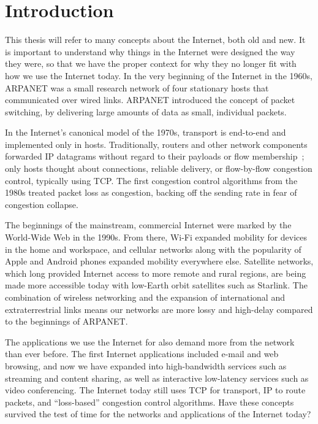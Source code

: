 \chapter{Introduction}
\label{sec:introduction}

This thesis will refer to many concepts about the Internet, both old and new.
It is important to understand why things in the Internet were designed the way
they were, so that we have the proper context for why they no longer fit with
how we use the Internet today. In the very beginning of the Internet in the
1960s, ARPANET was a small research network of four stationary hosts that
communicated over wired links. ARPANET introduced the concept of packet
switching, by delivering large amounts of data as small, individual packets.

In the Internet's canonical model of the 1970s, transport is end-to-end and
implemented only in hosts. Traditionally, routers and other network components
forwarded IP datagrams without regard to their payloads or flow
membership~\cite{saltzer1984endtoend, clark1988darpa}; only hosts thought about
connections, reliable delivery, or flow-by-flow congestion control, typically
using TCP. The first congestion control algorithms from the 1980s treated
packet loss as congestion, backing off the sending rate in fear of congestion
collapse.

The beginnings of the mainstream, commercial Internet were marked by the
World-Wide Web in the 1990s. From there, Wi-Fi expanded mobility for devices in
the home and workspace, and cellular networks along with the popularity of
Apple and Android phones expanded mobility everywhere else. Satellite networks,
which long provided Internet access to more remote and rural regions, are being
made more accessible today with low-Earth orbit satellites such as Starlink.
The combination of wireless networking and the expansion of international and
extraterrestrial links means our networks are more lossy and high-delay
compared to the beginnings of ARPANET.

The applications we use the Internet for also demand more from the network than
ever before. The first Internet applications included e-mail and web browsing,
and now we have expanded into high-bandwidth services such as streaming and
content sharing, as well as interactive low-latency services such as video
conferencing. The Internet today still uses TCP for transport, IP to route
packets, and ``loss-based'' congestion control algorithms. Have these concepts
survived the test of time for the networks and applications of the Internet
today?


